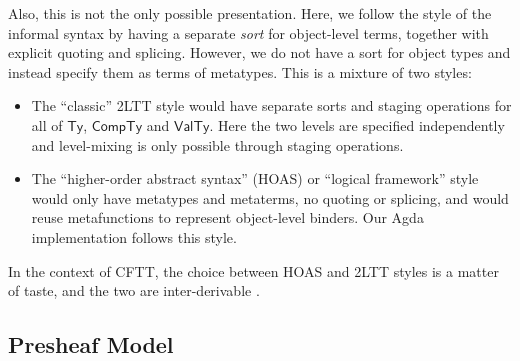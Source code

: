 \documentclass[acmsmall,screen]{acmart}
\newcommand{\msf}[1]{{\mathsf{#1}}}
\newcommand{\VTy}{\msf{ValTy}}
\newcommand{\Ty}{\msf{Ty}}
\newcommand{\CTy}{\msf{CompTy}}
\theoremstyle{remark}
\begin{document}
Also, this is not the only possible presentation. Here, we follow the style of
the informal syntax by having a separate \emph{sort} for object-level terms,
together with explicit quoting and splicing. However, we do not have a sort for
object types and instead specify them as terms of metatypes. This is a mixture
of two styles:
\begin{itemize}
\item The ``classic'' 2LTT style would have separate sorts and staging
  operations for all of $\Ty$, $\CTy$ and $\VTy$. Here the two levels are
  specified independently and level-mixing is only possible through staging
  operations.
\item The ``higher-order abstract syntax'' (HOAS) or ``logical framework'' style
  would only have metatypes and metaterms, no quoting or splicing, and would
  reuse metafunctions to represent object-level binders. Our Agda implementation
  follows this style.
\end{itemize}
In the context of CFTT, the choice between HOAS and 2LTT styles is a matter of
taste, and the two are inter-derivable \cite[Section
  3.3]{DBLP:journals/corr/abs-2302-08837}.

\subsection{Presheaf Model}
\end{document}
